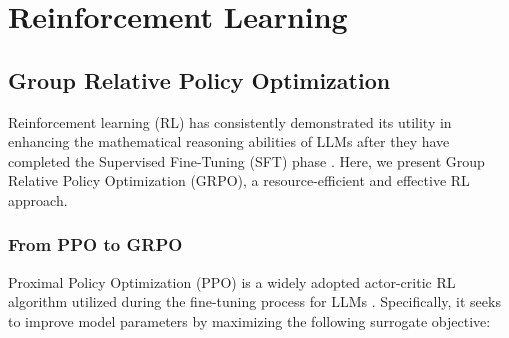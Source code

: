 \section{Reinforcement Learning}

\subsection{Group Relative Policy Optimization} Reinforcement learning (RL) has consistently demonstrated its utility in enhancing the mathematical reasoning abilities of LLMs after they have completed the Supervised Fine-Tuning (SFT) phase \citep{wang2023math,wizardmath}. Here, we present Group Relative Policy Optimization (GRPO), a resource-efficient and effective RL approach.

\subsubsection{From PPO to GRPO} Proximal Policy Optimization (PPO) \citep{schulman2017proximal} is a widely adopted actor-critic RL algorithm utilized during the fine-tuning process for LLMs \citep{ouyang2022training}. Specifically, it seeks to improve model parameters by maximizing the following surrogate objective:

